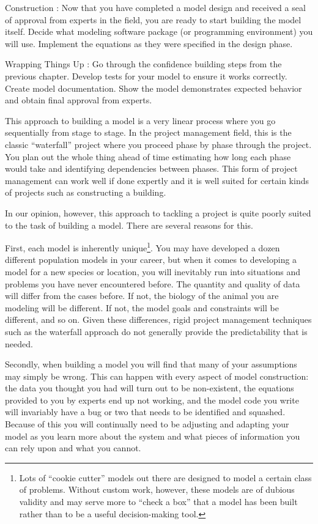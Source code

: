 \documentclass[]{memoir}
\begin{document}
Construction : Now that you have completed a model design and received a
seal of approval from experts in the field, you are ready to start
building the model itself. Decide what modeling software package (or
programming environment) you will use. Implement the equations as they
were specified in the design phase.

Wrapping Things Up : Go through the confidence building steps from the
previous chapter. Develop tests for your model to ensure it works
correctly. Create model documentation. Show the model demonstrates
expected behavior and obtain final approval from experts.

This approach to building a model is a very linear process where you go
sequentially from stage to stage. In the project management field, this
is the classic ``waterfall'' project where you proceed phase by phase
through the project. You plan out the whole thing ahead of time
estimating how long each phase would take and identifying dependencies
between phases. This form of project management can work well if done
expertly and it is well suited for certain kinds of projects such as
constructing a building.

In our opinion, however, this approach to tackling a project is quite
poorly suited to the task of building a model. There are several reasons
for this.

First, each model is inherently unique\footnote{Lots of ``cookie
  cutter'' models out there are designed to model a certain class of
  problems. Without custom work, however, these models are of dubious
  validity and may serve more to ``check a box'' that a model has been
  built rather than to be a useful decision-making tool.}. You may have
developed a dozen different population models in your career, but when
it comes to developing a model for a new species or location, you will
inevitably run into situations and problems you have never encountered
before. The quantity and quality of data will differ from the cases
before. If not, the biology of the animal you are modeling will be
different. If not, the model goals and constraints will be different,
and so on. Given these differences, rigid project management techniques
such as the waterfall approach do not generally provide the
predictability that is needed.

Secondly, when building a model you will find that many of your
assumptions may simply be wrong. This can happen with every aspect of
model construction: the data you thought you had will turn out to be
non-existent, the equations provided to you by experts end up not
working, and the model code you write will invariably have a bug or two
that needs to be identified and squashed. Because of this you will
continually need to be adjusting and adapting your model as you learn
more about the system and what pieces of information you can rely upon
and what you cannot.
\end{document}

